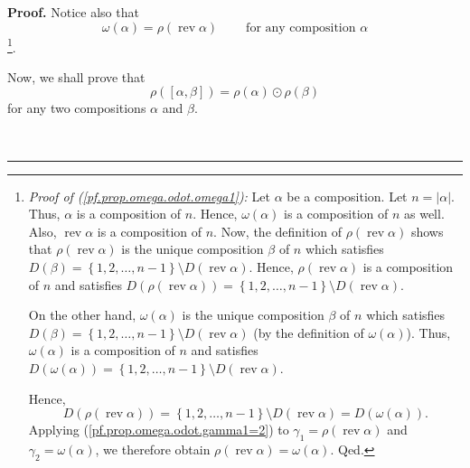 \documentclass
[numbers=enddot,12pt,final,onecolumn,notitlepage,abstracton]{scrartcl}%
\theoremstyle{definition}
\newenvironment{proof}[1][Proof]{\noindent\textbf{#1.} }{\ \rule{0.5em}{0.5em}}
\newenvironment{verlong}{}{}
\begin{document}
\begin{verlong}
\begin{proof}
Notice also that%
\begin{equation}
\omega\left(  \alpha\right)  =\rho\left(  \operatorname*{rev}\alpha\right)
\ \ \ \ \ \ \ \ \ \ \text{for any composition }\alpha
\label{pf.prop.omega.odot.omega1}%
\end{equation}
\footnote{\textit{Proof of (\ref{pf.prop.omega.odot.omega1}):} Let $\alpha$ be
a composition. Let $n=\left\vert \alpha\right\vert $. Thus, $\alpha$ is a
composition of $n$. Hence, $\omega\left(  \alpha\right)  $ is a composition of
$n$ as well. Also, $\operatorname*{rev}\alpha$ is a composition of $n$. Now,
the definition of $\rho\left(  \operatorname*{rev}\alpha\right)  $ shows that
$\rho\left(  \operatorname*{rev}\alpha\right)  $ is the unique composition
$\beta$ of $n$ which satisfies $D\left(  \beta\right)  =\left\{
1,2,\ldots,n-1\right\}  \setminus D\left(  \operatorname*{rev}\alpha\right)
$. Hence, $\rho\left(  \operatorname*{rev}\alpha\right)  $ is a composition of
$n$ and satisfies $D\left(  \rho\left(  \operatorname*{rev}\alpha\right)
\right)  =\left\{  1,2,\ldots,n-1\right\}  \setminus D\left(
\operatorname*{rev}\alpha\right)  $.
\par
On the other hand, $\omega\left(  \alpha\right)  $ is the unique composition
$\beta$ of $n$ which satisfies $D\left(  \beta\right)  =\left\{
1,2,\ldots,n-1\right\}  \setminus D\left(  \operatorname*{rev}\alpha\right)  $
(by the definition of $\omega\left(  \alpha\right)  $). Thus, $\omega\left(
\alpha\right)  $ is a composition of $n$ and satisfies $D\left(  \omega\left(
\alpha\right)  \right)  =\left\{  1,2,\ldots,n-1\right\}  \setminus D\left(
\operatorname*{rev}\alpha\right)  $.
\par
Hence,%
\[
D\left(  \rho\left(  \operatorname*{rev}\alpha\right)  \right)  =\left\{
1,2,\ldots,n-1\right\}  \setminus D\left(  \operatorname*{rev}\alpha\right)
=D\left(  \omega\left(  \alpha\right)  \right)  .
\]
Applying (\ref{pf.prop.omega.odot.gamma1=2}) to $\gamma_{1}=\rho\left(
\operatorname*{rev}\alpha\right)  $ and $\gamma_{2}=\omega\left(
\alpha\right)  $, we therefore obtain $\rho\left(  \operatorname*{rev}%
\alpha\right)  =\omega\left(  \alpha\right)  $. Qed.}.

Now, we shall prove that%
\begin{equation}
\rho\left(  \left[  \alpha,\beta\right]  \right)  =\rho\left(  \alpha\right)
\odot\rho\left(  \beta\right)  \label{pf.prop.omega.odot.1}%
\end{equation}
for any two compositions $\alpha$ and $\beta$.


\end{proof}
\end{verlong}
\end{document}
